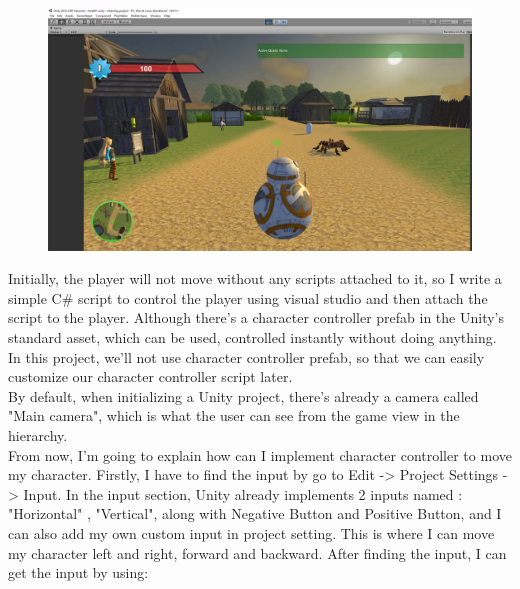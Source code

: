 \documentclass[a4paper, 13pt]{extarticle}
\begin{document}
 	 \begin{figure}[h]
 	 	\centering
 	 	\begin{minipage}{1\textwidth}
 	 		\centering
 	 		\includegraphics[width=0.75\linewidth]{intructions/4.png}
 	 		\label{fig:test5}
 	 	\end{minipage}
 	 \end{figure}
 	  
 	 Initially, the player will not move without any scripts attached to it, so I write a simple C\# script to control the player using visual studio and then attach the script to the player. Although there's a character controller prefab in the Unity's standard asset, which can be used, controlled instantly without doing anything. In this project, we'll not use character controller prefab, so that we can easily customize our character controller script later. \\[0.25cm] By default, when initializing a Unity project, there's already a camera called "Main camera", which is what the user can see from the game view in the hierarchy.  
 	 \\[0.25cm] From now, I'm going to explain how can I implement character controller to move my character. Firstly, I have to find the input by go to Edit -> Project Settings -> Input. In the input section, Unity already implements 2 inputs named : "Horizontal" , "Vertical", along with Negative Button and Positive Button, and I can also add my own custom input in project setting. This is where I can move my character left and right, forward and backward. After finding the input, I can get the input by using: 
  
\end{document}
